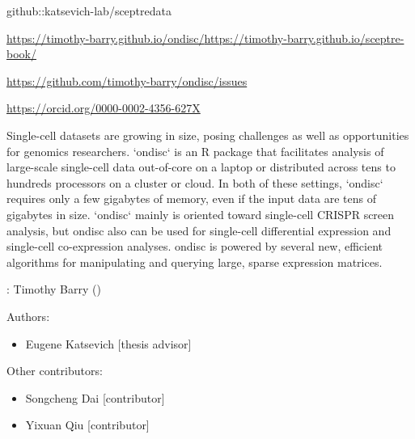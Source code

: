 \documentclass[a4paper]{book}
\begin{document}
\begin{description}
{github::katsevich-lab/sceptredata}
\item[Config/testthat/edition]
\item[URL]\AsIs{}\url{https://timothy-barry.github.io/ondisc/}\AsIs{,
}\url{https://timothy-barry.github.io/sceptre-book/}\AsIs{}
\item[BugReports]\AsIs{}\url{https://github.com/timothy-barry/ondisc/issues}\AsIs{}
\item[VignetteBuilder]
\item[NeedsCompilation]
\item[Author]\url{https://orcid.org/0000-0002-4356-627X}
\item[Maintainer]\AsIs{}
\item[Depends]
\end{description}
%
\begin{Description}
Single-cell datasets are growing in size, posing challenges as well as opportunities for genomics researchers. `ondisc` is an R package that facilitates analysis of large-scale single-cell data out-of-core on a laptop or distributed across tens to hundreds processors on a cluster or cloud. In both of these settings, `ondisc` requires only a few gigabytes of memory, even if the input data are tens of gigabytes in size. `ondisc` mainly is oriented toward single-cell CRISPR screen analysis, but ondisc also can be used for single-cell differential expression and single-cell co-expression analyses. ondisc is powered by several new, efficient algorithms for manipulating and querying large, sparse expression matrices.
\end{Description}
%
\begin{Author}
: Timothy Barry  ()

Authors:
\begin{itemize}

\item{} Eugene Katsevich  [thesis advisor]

\end{itemize}


Other contributors:
\begin{itemize}

\item{} Songcheng Dai [contributor]
\item{} Yixuan Qiu [contributor]

\end{itemize}


\end{Author}
\end{document}
